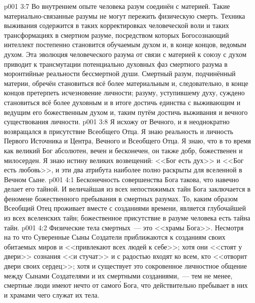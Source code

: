 \vs p001 3:7 \pc Во внутреннем опыте человека разум соединён с материей. Такие материально\hyp{}связанные разумы не могут пережить физическую смерть. Техника выживания содержится в таких корректировках человеческой воли и таких трансформациях в смертном разуме, посредством которых Богосознающий интеллект постепенно становится обучаемым духом и, в конце концов, ведомым духом. Эта эволюция человеческого разума от связи с материей к союзу с духом приводит к трансмутации потенциально духовных фаз смертного разума в моронтийные реальности бессмертной души. Смертный разум, подчинённый материи, обречён становиться всё более материальным и, следовательно, в конце концов претерпеть исчезновение личности; разуму, уступившему духу, суждено становиться всё более духовным и в итоге достичь единства с выживающим и ведущим его божественным духом и, таким путём достичь выживания и вечного существования личности.
\vs p001 3:8 Я исхожу от Вечного, и я неоднократно возвращался в присутствие Всеобщего Отца. Я знаю реальность и личность Первого Источника и Центра, Вечного и Всеобщего Отца. Я знаю, что в то время как великий Бог абсолютен, вечен и бесконечен, он также добр, божественен и милосерден. Я знаю истину великих возвещений: <<Бог есть дух>> и <<Бог есть любовь>>, и эти два атрибута наиболее полно раскрыты для вселенной в Вечном Сыне.
\vs p001 4:1 Бесконечность совершенства Бога такова, что навечно делает его тайной. И величайшая из всех непостижимых тайн Бога заключается в феномене божественного пребывания в смертных разумах. То, каким образом Всеобщий Отец проживает вместе с созданиями времени, является глубочайшей из всех вселенских тайн; божественное присутствие в разуме человека есть тайна тайн.
\vs p001 4:2 Физические тела смертных~--- это <<храмы Бога>>. Несмотря на то что Суверенные Сыны Создатели приближаются к созданиям своих обитаемых миров и <<привлекают всех людей к себе>>; хотя они <<стоят у двери>> сознания <<и стучат>> и с радостью входят ко всем, кто <<отворит двери своих сердец>>; хотя и существует это сокровенное личностное общение между Сынами Создателями и их смертными созданиями,~--- тем не менее, смертные люди имеют нечто от самог\'о Бога, что действительно пребывает в них и храмами чего служат их тела.
